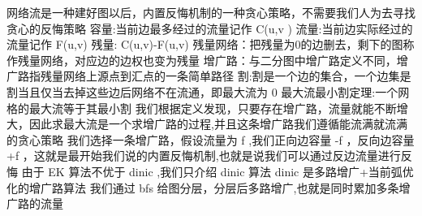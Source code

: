 {}
\markdownRendererSectionEnd \markdownRendererSectionBegin
{}\markdownRendererInterblockSeparator
{}\markdownRendererInterblockSeparator
{}
\markdownRendererSectionEnd 
\markdownRendererSectionEnd \markdownRendererSectionBegin
{}\markdownRendererInterblockSeparator
{}网络流是一种建好图以后，内置反悔机制的一种贪心策略，不需要我们人为去寻找贪心的反悔策略\markdownRendererParagraphSeparator
{}容量:当前边最多经过的流量记作\markdownRendererDollarSign{} C(u,v\markdownRendererSoftLineBreak
{}) \markdownRendererDollarSign{}\markdownRendererParagraphSeparator
{}流量:当前边实际经过的流量记作\markdownRendererDollarSign{} F(u,v) \markdownRendererDollarSign{}\markdownRendererParagraphSeparator
{}残量:\markdownRendererDollarSign{} C(u,v)-F(u,v) \markdownRendererDollarSign{}\markdownRendererParagraphSeparator
{}残量网络：把残量为0的边删去，剩下的图称作残量网络，对应边的边权也变为残量\markdownRendererParagraphSeparator
{}增广路：与二分图中增广路定义不同，增广路指残量网络上源点到汇点的一条简单路径\markdownRendererParagraphSeparator
{}割:割是一个边的集合，一个边集是割当且仅当去掉这些边后网络不在流通，即最大流为\markdownRendererDollarSign{} 0 \markdownRendererDollarSign{}\markdownRendererParagraphSeparator
{}最大流最小割定理:一个网格的最大流等于其最小割\markdownRendererParagraphSeparator
{}我们根据定义发现，只要存在增广路，流量就能不断增大，因此求最大流是一个求增广路的过程,并且这条增广路我们遵循能流满就流满的贪心策略\markdownRendererParagraphSeparator
{}我们选择一条增广路，假设流量为\markdownRendererDollarSign{} f\markdownRendererSoftLineBreak
{}\markdownRendererDollarSign{},我们正向边容量\markdownRendererDollarSign{} -f \markdownRendererDollarSign{}，反向边容量\markdownRendererDollarSign{} +f\markdownRendererSoftLineBreak
{}\markdownRendererDollarSign{}，这就是最开始我们说的内置反悔机制,也就是说我们可以通过反边流量进行反悔\markdownRendererParagraphSeparator
{}由于\markdownRendererDollarSign{} EK \markdownRendererDollarSign{}算法不优于\markdownRendererDollarSign{} dinic \markdownRendererDollarSign{},我们只介绍\markdownRendererDollarSign{} dinic \markdownRendererDollarSign{}算法\markdownRendererParagraphSeparator
{}\markdownRendererDollarSign{} dinic \markdownRendererDollarSign{}是多路增广+当前弧优化的增广路算法\markdownRendererParagraphSeparator
{}我们通过\markdownRendererDollarSign{} bfs \markdownRendererDollarSign{}给图分层，分层后多路增广,也就是同时累加多条增广路的流量\markdownRendererParagraphSeparator
